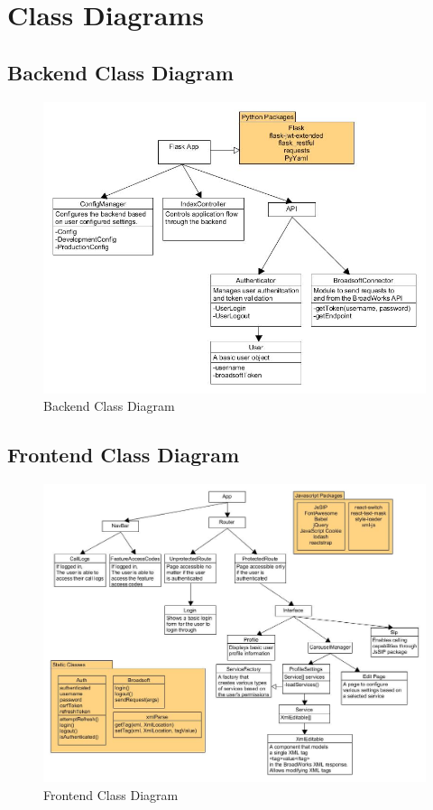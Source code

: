 \documentclass[12pt]{article}
\begin{document}
\pagebreak
	
\section{Class Diagrams}
\subsection{Backend Class Diagram}


	\begin{figure}[htb]
	\includegraphics[width=\textwidth]{BackendClassDiagram.jpg}
	\caption{Backend Class Diagram}
	\end{figure}
	
	\pagebreak

\subsection{Frontend Class Diagram}
	
	\begin{figure}[htb]
	\includegraphics[width=\textwidth]{FrontendClassDiagram.jpg}
	\caption{Frontend Class Diagram}
	\end{figure}
\end{document}
